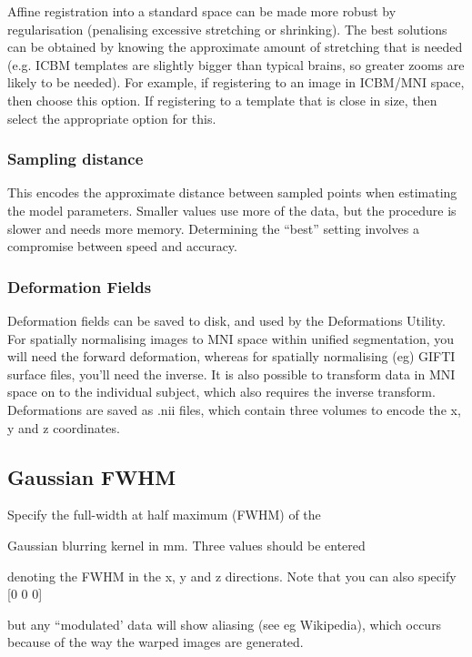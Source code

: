 Affine registration into a standard space can be made more robust by regularisation (penalising excessive stretching or shrinking).  The best solutions can be obtained by knowing the approximate amount of stretching that is needed (e.g. ICBM templates are slightly bigger than typical brains, so greater zooms are likely to be needed). For example, if registering to an image in ICBM/MNI space, then choose this option.  If registering to a template that is close in size, then select the appropriate option for this.


\subsubsection{Sampling distance}
This encodes the approximate distance between sampled points when estimating the model parameters. Smaller values use more of the data, but the procedure is slower and needs more memory. Determining the ``best'' setting involves a compromise between speed and accuracy.


\subsubsection{Deformation Fields}
Deformation fields can be saved to disk, and used by the Deformations Utility. For spatially normalising images to MNI space within unified segmentation, you will need the forward deformation, whereas for spatially normalising (eg) GIFTI surface files, you'll need the inverse. It is also possible to transform data in MNI space on to the individual subject, which also requires the inverse transform. Deformations are saved as .nii files, which contain three volumes to encode the x, y and z coordinates.


\subsection{Gaussian FWHM}
Specify the full-width at half maximum (FWHM) of the 

Gaussian blurring kernel in mm. Three values should be entered

denoting the FWHM in the x, y and z directions. Note that you can also specify [0 0 0]

but any ``modulated' data will show aliasing (see eg Wikipedia), which occurs because of the way the warped images are generated.

